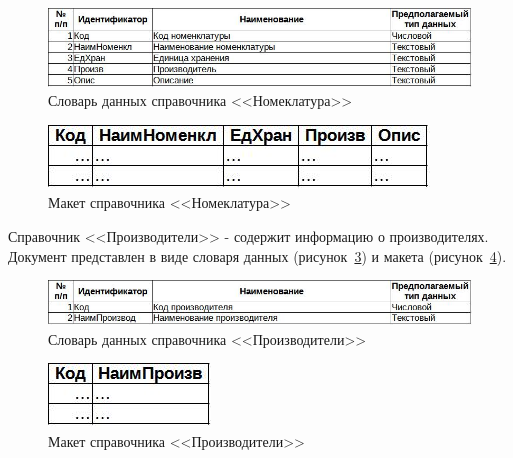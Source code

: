 \documentclass[12pt, a4paper, simple]{eskdtext}
\begin{document}
    \begin{figure}[!h]
        \centering
        \includegraphics[width=14cm]
            {_docs/СП_Номенкл_типы.jpg}
        \caption{Словарь данных справочника <<Номеклатура>>}
        \label{fig:cd_Nomenkl_tipi}
    \end{figure}

    \begin{figure}[!h]
        \centering
        \includegraphics[]
            {_docs/СП_Номенкл_макет.jpg}
        \caption{Макет справочника <<Номеклатура>>}
        \label{fig:cd_Nomenkl_maket}
    \end{figure}

    \newpage

    Справочник <<Производители>> - содержит информацию о производителях.
    Документ представлен в виде словаря данных (рисунок~\ref{fig:cd_Proizv_tipi})
    и макета (рисунок~\ref{fig:cd_Proizv_maket}).

    \begin{figure}[!h]
        \centering
        \includegraphics[width=14cm]
            {_docs/СП_Произв_типы.jpg}
        \caption{Словарь данных справочника <<Производители>>}
        \label{fig:cd_Proizv_tipi}
    \end{figure}

    \begin{figure}[!h]
        \centering
        \includegraphics[]
            {_docs/СП_Произв_макет.jpg}
        \caption{Макет справочника <<Производители>>}
        \label{fig:cd_Proizv_maket}
    \end{figure}
\end{document}
